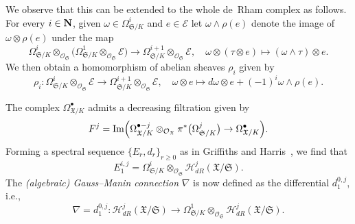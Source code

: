 \begin{rem}
We observe that this can be extended to the whole de~Rham complex as follows. 
For every $i \in \mathbf{N}$, given $\omega \in \Omega_{\mathfrak{S}/K}^i$ and 
$e \in \mathcal{E}$ let $\omega \wedge \rho(e)$ denote the image of 
$\omega \otimes \rho(e)$ under the map
\begin{equation*}
\Omega_{\mathfrak{S}/K}^i \otimes_{\mathcal{O}_{\mathfrak{S}}} 
    \bigl(\Omega_{\mathfrak{S}/K}^1 \otimes_{\mathcal{O}_{\mathfrak{S}}} \mathcal{E}\bigr) 
    \to \Omega_{\mathfrak{S}/K}^{i+1} \otimes_{\mathcal{O}_{\mathfrak{S}}} \mathcal{E}, \quad 
\omega \otimes (\tau \otimes e) \mapsto (\omega \wedge \tau) \otimes e.
\end{equation*}
We then obtain a homomorphism of abelian sheaves $\rho_i$ given by 
\begin{equation*}
\rho_i \colon \Omega_{\mathfrak{S}/K}^i \otimes_{\mathcal{O}_{\mathfrak{S}}} \mathcal{E} 
    \to \Omega_{\mathfrak{S}/K}^{i+1} \otimes_{\mathcal{O}_{\mathfrak{S}}} \mathcal{E}, \quad 
    \omega \otimes e \mapsto d \omega \otimes e + (-1)^i \omega \wedge \rho(e).
\end{equation*}
\end{rem}

\begin{defn}
The complex $\Omega_{\mathfrak{X}/K}^{\bullet}$ admits a decreasing filtration given by 
\begin{equation*}
F^j = 
    \operatorname{Im}\Bigl( \Omega_{\mathfrak{X}/K}^{\bullet - j} \otimes_{\mathcal{O}_{\mathfrak{X}}} 
    \pi^* \bigl(\Omega_{\mathfrak{S}/K}^j\bigr) \rightarrow \Omega_{\mathfrak{X}/K}^{\bullet} \Bigr).
\end{equation*}
Forming a spectral sequence $\{E_r, d_r\}_{r \geq 0}$ as in Griffiths and 
Harris~\citep[\S 3.5, p.\ 440]{GriffithsHarris1978}, we find that 
\begin{equation*}
E_1^{i,j} = 
    \Omega_{\mathfrak{S}/K}^i \otimes_{\mathcal{O}_{\mathfrak{S}}} 
    \mathcal{H}_{dR}^j(\mathfrak{X}/\mathfrak{S}).
\end{equation*}
The \emph{(algebraic) Gauss--Manin connection} $\nabla$ is now defined as 
the differential $d_1^{0,j}$, i.e., 
\begin{equation*}
\nabla = 
    d_1^{0,j} \colon \mathcal{H}_{dR}^j(\mathfrak{X}/\mathfrak{S}) \to 
    \Omega_{\mathfrak{S}/K}^1 \otimes_{\mathcal{O}_{\mathfrak{S}}} 
    \mathcal{H}_{dR}^j(\mathfrak{X}/\mathfrak{S}).
\end{equation*}
\end{defn}

